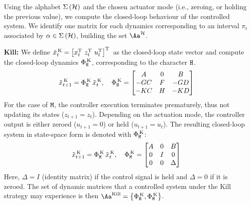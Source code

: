 Using the alphabet $\Sigma\left(\mathcal{H}\right)$ and the chosen actuator mode (i.e., zeroing, or holding the previous value), we compute the closed-loop behaviour of the controlled system.
We identify one matrix for each dynamics corresponding to an interval $\pi_t$ associated by $\alpha \in \Sigma\left( \mathcal{H} \right)$, building the set $\Aa^\strat$.

\textbf{Kill: }%
%
We define $\tilde x_t^{\,\text{K}} = \left[ x_t^{\mathrm{\small{T}}}{}\,\, z_t^{\mathrm{\small{T}}}{}\,\, u_t^{\mathrm{\small{T}}}{} \right]^{\mathrm{\small{T}}}{}$ as the closed-loop state vector and compute the closed-loop dynamics $\Phi{}^{\,\text{K}}_{\texttt{H}}$, corresponding to the character $\texttt{H}$.
\begin{equation*}
    \tilde x_{t+1}^{\,\text{K}} = \Phi{}^{\,\text{K}}_{\texttt{H}}\,\tilde x_t^{\,\text{K}}, \quad
    \Phi{}^{\,\text{K}}_{\texttt{H}} = \begin{bmatrix}
        A       & 0    & B       \\
        -GC   & F  & -GD   \\
        -KC   & H  & -KD   \\
    \end{bmatrix}
\end{equation*}
%
For the case of $\texttt{M}$, the controller execution terminates prematurely, thus not updating its states ($z_{t+1} = z_t$).
Depending on the actuation mode, the controller output is either zeroed ($u_{t+1} = 0$) or held ($u_{t+1} = u_t$).
The resulting closed-loop system in state-space form is denoted with $\Phi{}^{\,\text{K}}_{\texttt{M}}$:
\begin{equation*}
    \tilde x_{t+1}^{\,\text{K}} = \Phi{}^{\,\text{K}}_{\texttt{M}}\,\tilde x_t^{\,\text{K}}, \quad
    \Phi{}^{\,\text{K}}_{\texttt{M}} = \begin{bmatrix}
        A & 0  & B \\
        0   & I  & 0   \\
        0   & 0  & \Delta
    \end{bmatrix}
\end{equation*}
Here, $\Delta = I$ (identity matrix) if the control signal is held and $\Delta = 0$ if it is zeroed.
The set of dynamic matrices that a controlled system under the Kill strategy may experience is then $\Aa^{\text{Kill}}=\left\{\clmat{}^{\,\text{K}}_{\cH},\clmat{}^{\,\text{K}}_{\cM}\right\}$.

